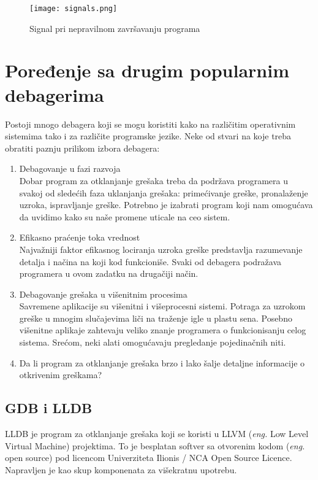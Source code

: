 \documentclass[a4paper]{article}
\begin{document}
\begin{figure}[h!]
\begin{center}
\texttt{[image: signals.png]}
\end{center}
\caption{Signal pri nepravilnom završavanju programa}
\label{fig:signals}
\end{figure}


\section{Poređenje sa drugim popularnim debagerima}
\label{sec:poredjenje}
Postoji mnogo debagera koji se mogu koristiti kako
na različitim operativnim sistemima tako i za različite programske jezike. 
Neke od stvari na koje treba obratiti paznju prilikom izbora debagera:

\begin{enumerate}
\item Debagovanje u fazi razvoja \\
Dobar program za otklanjanje grešaka treba da podržava
programera u svakoj od sledećih faza uklanjanja grešaka:
primećivanje greške, pronalaženje uzroka, ispravljanje greške.
Potrebno je izabrati program koji nam omogućava da uvidimo kako
su naše promene uticale na ceo sistem.
\item Efikasno praćenje toka vrednost\\
Najvažniji faktor efikasnog lociranja uzroka greške predstavlja
razumevanje detalja i načina na koji kod funkcioniše. Svaki od
debagera podražava programera u ovom zadatku na drugačiji način.
\item Debagovanje grešaka u višenitnim procesima\\
Savremene aplikacije su višenitni i višeprocesni sistemi. 
Potraga za uzrokom greške u mnogim slučajevima liči na traženje igle
u plastu sena. Posebno višenitne aplikaje zahtevaju veliko znanje
programera o funkcionisanju celog sistema.\cite{tools} 
Srećom, neki alati omogućavaju pregledanje pojedinačnih niti.
\item Da li program za otklanjanje grešaka brzo i lako šalje detaljne informacije o otkrivenim greškama?
\end{enumerate}

\subsection{GDB i LLDB}
\label{subsec:lldb}
LLDB je program za otklanjanje grešaka koji se koristi u LLVM 
(\textit{eng.} Low Level Virtual Machine) projektima. To je besplatan softver sa 
otvorenim kodom (\textit{eng.} open source) pod licencom 
Univerziteta Ilionis / NCA Open Source Licence. Napravljen je kao 
skup komponenata za višekratnu upotrebu. \cite{lldb}
\end{document}
